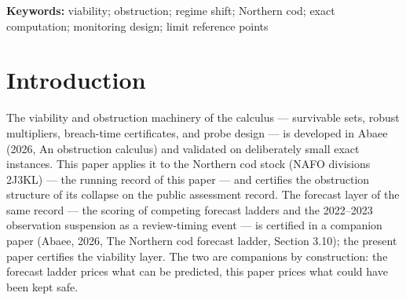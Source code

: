 \documentclass[10pt,twocolumn]{article}
\theoremstyle{plain}
\theoremstyle{remark}
\begin{document}
\begin{abstract}
collapse-era steps 1991--1995 certify as declines and the 1993 floor
breach holds at the band's upper edge (\(115 < 276\)), while no
reference-decade step certifies; the reference decade's window profile
shows every subwindow of horizon four or more growing (the sustained-decline
reading holds only at horizons one to three); and the vintage's own
1954--1982 record has the window opening at \(28.3\%\) of the 1962 peak,
three years after a prior floor episode (1977--1979). The collapse is present in the raw survey index (a certified
factor of \(\tfrac{21797}{2127417}\) over 1989--1994, falling \(2.6\)
times further than the assessment series over their common window);
the forage-fish covariate collapses in the same annual step in which
the mortality diagnostic crosses \(M=1\), two steps before the floor
breach; and both assessment vintages re-cross the floor at the 2015
reading, with outcome years at most
\(\tfrac{44000}{88460} \approx 49.7\%\) of the reference point. Every
quantity is regenerated by an accompanying verification script in
exact rational arithmetic.
\end{abstract}

\textbf{Keywords:} viability; obstruction; regime shift; Northern cod;
exact computation; monitoring design; limit reference points

\section{Introduction}\label{intro}

The viability and obstruction machinery of the calculus --- survivable
sets, robust multipliers, breach-time certificates, and probe design ---
is developed in Abaee (2026, An obstruction calculus) and validated on deliberately small exact
instances. This paper applies it to the Northern cod stock (NAFO
divisions 2J3KL) --- the running record of this paper --- and certifies
the obstruction structure of its collapse on the public assessment
record. The forecast layer of the
same record --- the scoring of competing forecast ladders and the
2022--2023 observation suspension as a review-timing event --- is
certified in a companion paper (Abaee, 2026, The Northern cod forecast ladder, Section 3.10); the
present paper certifies the viability layer. The two are companions by
construction: the forecast ladder prices what can be predicted, this
paper prices what could have been kept safe.
\end{document}
